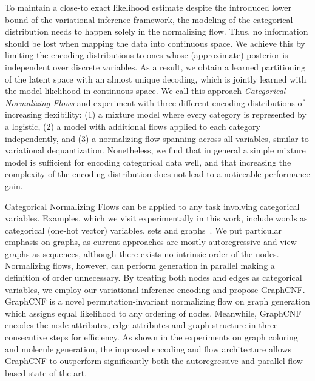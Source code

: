 To maintain a close-to exact likelihood estimate despite the introduced lower bound of the variational inference framework, the modeling of the categorical distribution needs to happen solely in the normalizing flow.
Thus, no information should be lost when mapping the data into continuous space.
We achieve this by limiting the encoding distributions to ones whose (approximate) posterior is independent over discrete variables. 
As a result, we obtain a learned partitioning of the latent space with an almost unique decoding, which is jointly learned with the model likelihood in continuous space.
We call this approach \emph{Categorical Normalizing Flows} and experiment with three different encoding distributions of increasing flexibility: (1) a mixture model where every category is represented by a logistic, (2) a model with additional flows applied to each category independently, and (3) a normalizing flow spanning across all variables, similar to variational dequantization.
Nonetheless, we find that in general a simple mixture model is sufficient for encoding categorical data well, and that increasing the complexity of the encoding distribution does not lead to a noticeable performance gain.

Categorical Normalizing Flows can be applied to any task involving categorical variables.
Examples, which we visit experimentally in this work, include words as categorical (one-hot vector) variables, sets and graphs~\cite{GraphOverview1, GraphOverview2}.
We put particular emphasis on graphs, as
current approaches are mostly autoregressive \cite{GraphRNNDeep, GraphAF, GraphRNN} and view graphs as sequences, although there exists no intrinsic order of the nodes. 
Normalizing flows, however, can perform generation in parallel making a definition of order unnecessary. 
By treating both nodes and edges as categorical variables, we employ our variational inference encoding and propose GraphCNF.
GraphCNF is a novel permutation-invariant normalizing flow on graph generation which assigns equal likelihood to any ordering of nodes. 
Meanwhile, GraphCNF encodes the node attributes, edge attributes and graph structure in three consecutive steps for efficiency.
As shown in the experiments on graph coloring and molecule generation, the improved encoding and flow architecture allows GraphCNF to outperform significantly both the autoregressive and parallel flow-based state-of-the-art.

